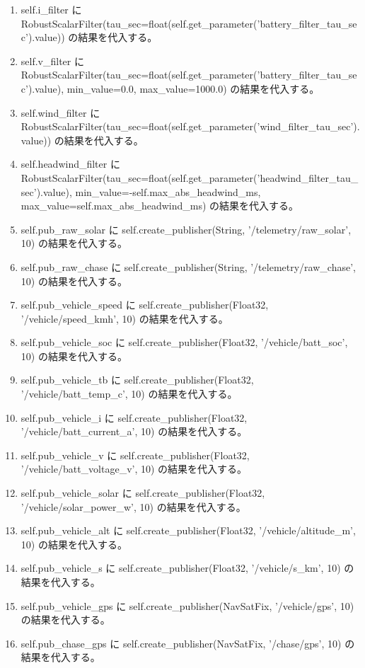 \documentclass[a4paper,11pt]{article}
\begin{document}
\begin{enumerate}[leftmargin=1.8em]
\item self.i\_filter に RobustScalarFilter(tau\_sec=float(self.get\_parameter('battery\_filter\_tau\_sec').value)) の結果を代入する。
\item self.v\_filter に RobustScalarFilter(tau\_sec=float(self.get\_parameter('battery\_filter\_tau\_sec').value), min\_value=0.0, max\_value=1000.0) の結果を代入する。
\item self.wind\_filter に RobustScalarFilter(tau\_sec=float(self.get\_parameter('wind\_filter\_tau\_sec').value)) の結果を代入する。
\item self.headwind\_filter に RobustScalarFilter(tau\_sec=float(self.get\_parameter('headwind\_filter\_tau\_sec').value), min\_value=-self.max\_abs\_headwind\_ms, max\_value=self.max\_abs\_headwind\_ms) の結果を代入する。
\item self.pub\_raw\_solar に self.create\_publisher(String, '/telemetry/raw\_solar', 10) の結果を代入する。
\item self.pub\_raw\_chase に self.create\_publisher(String, '/telemetry/raw\_chase', 10) の結果を代入する。
\item self.pub\_vehicle\_speed に self.create\_publisher(Float32, '/vehicle/speed\_kmh', 10) の結果を代入する。
\item self.pub\_vehicle\_soc に self.create\_publisher(Float32, '/vehicle/batt\_soc', 10) の結果を代入する。
\item self.pub\_vehicle\_tb に self.create\_publisher(Float32, '/vehicle/batt\_temp\_c', 10) の結果を代入する。
\item self.pub\_vehicle\_i に self.create\_publisher(Float32, '/vehicle/batt\_current\_a', 10) の結果を代入する。
\item self.pub\_vehicle\_v に self.create\_publisher(Float32, '/vehicle/batt\_voltage\_v', 10) の結果を代入する。
\item self.pub\_vehicle\_solar に self.create\_publisher(Float32, '/vehicle/solar\_power\_w', 10) の結果を代入する。
\item self.pub\_vehicle\_alt に self.create\_publisher(Float32, '/vehicle/altitude\_m', 10) の結果を代入する。
\item self.pub\_vehicle\_s に self.create\_publisher(Float32, '/vehicle/s\_km', 10) の結果を代入する。
\item self.pub\_vehicle\_gps に self.create\_publisher(NavSatFix, '/vehicle/gps', 10) の結果を代入する。
\item self.pub\_chase\_gps に self.create\_publisher(NavSatFix, '/chase/gps', 10) の結果を代入する。

\end{enumerate}
\end{document}

